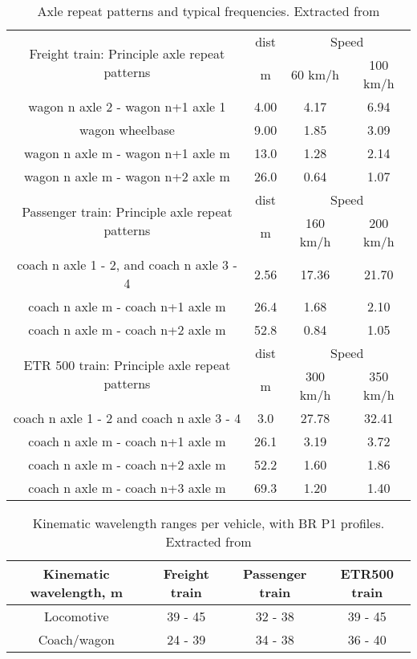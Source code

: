 \begin{appendices}
\begin{table}[h]
    \centering
    \begin{tabular}{c|c|c|c}
    \hline
    \multirow{2}{*}{Freight train: Principle axle repeat patterns} & dist & \multicolumn{2}{c}{Speed} \\
    & m & 60 km/h & 100 km/h \\
    \hline
    wagon n axle 2 - wagon n+1 axle 1 & 4.00 & 4.17 & 6.94 \\
    wagon wheelbase & 9.00 & 1.85 & 3.09 \\
    wagon n axle m - wagon n+1 axle m & 13.0 & 1.28 & 2.14 \\
    wagon n axle m - wagon n+2 axle m & 26.0 & 0.64 & 1.07 \\
    \hline
    \multirow{2}{*}{Passenger train: Principle axle repeat patterns} & dist & \multicolumn{2}{c}{Speed} \\
    & m & 160 km/h & 200 km/h \\
    \hline
    coach n axle 1 - 2, and coach n axle 3 - 4 & 2.56 & 17.36 & 21.70 \\
    coach n axle m - coach n+1 axle m & 26.4 & 1.68 & 2.10 \\
    coach n axle m - coach n+2 axle m & 52.8 & 0.84 & 1.05 \\
    \hline
    \multirow{2}{*}{ETR 500 train: Principle axle repeat patterns} & dist & \multicolumn{2}{c}{Speed} \\
    & m & 300 km/h & 350 km/h \\
    \hline
    coach n axle 1 - 2 and coach n axle 3 - 4 & 3.0 & 27.78 & 32.41 \\
    coach n axle m - coach n+1 axle m & 26.1 & 3.19 & 3.72 \\
    coach n axle m - coach n+2 axle m & 52.2 & 1.60 & 1.86 \\
    coach n axle m - coach n+3 axle m & 69.3 & 1.20 & 1.40 \\
    \hline
    \end{tabular}
    \caption{Axle repeat patterns and typical frequencies. Extracted from \cite[Appendix C]{d181dt329}}
    \label{tab:329axlerepeat}
\end{table}

\begin{table}[h]
    \centering
    \begin{tabular}{c|c|c|c}
    \hline
    Kinematic wavelength, m & Freight train & Passenger train & ETR500 train \\
    \hline
    Locomotive & 39 - 45 & 32 - 38 & 39 - 45 \\
    Coach/wagon & 24 - 39 & 34 - 38 & 36 - 40 \\
    \hline
    \end{tabular}
    \caption{Kinematic wavelength ranges per vehicle, with BR P1 profiles. Extracted from \cite[Appendix C]{d181dt329}}
    \label{tab:329kinematicwavelength}
\end{table}


\end{appendices}
